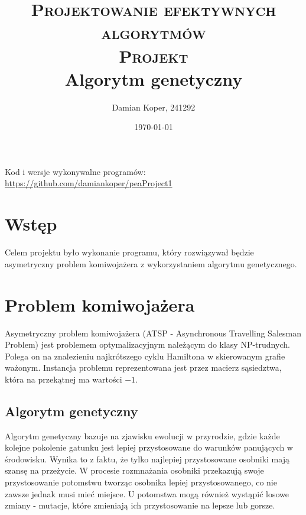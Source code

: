 \documentclass[12pt]{article}
\title{ 
    \vspace*{50mm}
    \textsc{
        \textbf{Projektowanie efektywnych algorytmów}\\
    \vspace*{10mm}
    \large Projekt\\
        }
        \normalsize
         Algorytm genetyczny
         \vspace*{5mm}
         }
\author{
Damian Koper,  241292\\
}
\date{\today}
\begin{document}
\maketitle

\newpage
\setcounter{tocdepth}{2}
\localtableofcontents
\listoffigures
\listoftables
\vfill
Kod i wersje wykonywalne programów: \url{https://github.com/damiankoper/peaProject1}
\newpage

\section{Wstęp}
Celem projektu było wykonanie programu, który rozwiązywał będzie asymetryczny
problem komiwojażera z wykorzystaniem algorytmu genetycznego.
\section{Problem komiwojażera}
Asymetryczny problem komiwojażera (ATSP - Asynchronous Travelling Salesman Problem) jest problemem optymalizacyjnym należącym do klasy NP-trudnych.
Polega on na znalezieniu najkrótszego cyklu Hamiltona w skierowanym grafie ważonym. Instancja problemu reprezentowana jest przez macierz sąsiedztwa, która na
przekątnej ma wartości $-1$.

\subsection{Algorytm genetyczny}
Algorytm genetyczny bazuje na zjawisku ewolucji w przyrodzie, gdzie każde kolejne pokolenie gatunku jest lepiej przystosowane do warunków panujących w środowisku.
Wynika to z faktu, że tylko najlepiej przystosowane osobniki mają szansę na przeżycie. W procesie rozmnażania osobniki przekazują swoje przystosowanie potomstwu
tworząc osobnika lepiej przystosowanego, co nie zawsze jednak musi mieć miejsce. U potomstwa mogą również wystąpić losowe zmiany - mutacje, które zmieniają ich przystosowanie na lepsze lub gorsze.
\end{document}
